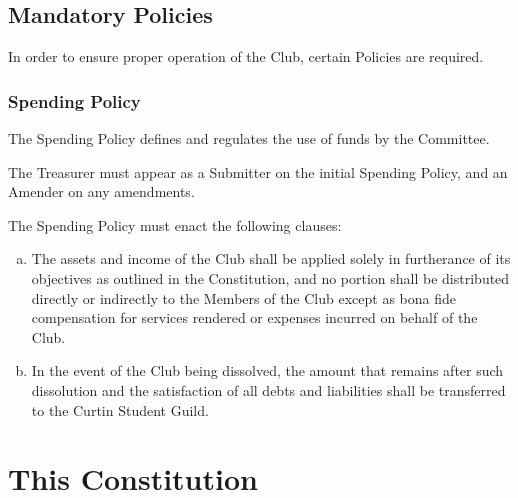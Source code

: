 \documentclass[a4paper,12pt]{article}
\begin{document}
\subsection{Mandatory Policies}

In order to ensure proper operation of the Club, certain Policies are required.

\subsubsection{Spending Policy}

The Spending Policy defines and regulates the use of funds by the Committee.

The Treasurer must appear as a Submitter on the initial Spending Policy, and an Amender on any amendments.

The Spending Policy must enact the following clauses:
\begin{enumerate}[a)]
	\item The assets and income of the Club shall be applied solely in furtherance of its objectives as outlined in the Constitution, and no portion shall be distributed directly or indirectly to the Members of the Club except as bona fide compensation for services rendered or expenses incurred on behalf of the Club.
	\item In the event of the Club being dissolved, the amount that remains after such dissolution and the satisfaction of all debts and liabilities shall be transferred to the Curtin Student Guild.
\end{enumerate}

\section{This Constitution}
\end{document}
